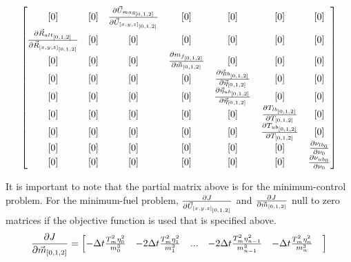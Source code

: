 \begin{equation}
\begin{bmatrix}
[0] &
[0] &
\pdv{\vec{U}_{mag_{[0,1,2]}}}{\vec{U}_{[x,y,z]_{[0,1,2]}}} &
[0] &
[0] &
[0] &
[0]  \\

\pdv{\vec{R}_{alt_{[0,1,2]}}}{\vec{R}_{[x,y,z]_{[0,1,2]}}} &
[0] &
[0] &
[0] &
[0] &
[0] &
[0]  \\

[0] &
[0] &
[0] &
\pdv{m_{f_{[0,1,2]}}}{\vec{m}_{[0,1,2]}} &
[0] &
[0] &
[0]  \\

[0] &
[0] &
[0] &
[0] &
\pdv{\vec{\eta}_{lb_{[0,1,2]}}}{\vec{\eta}_{[0,1,2]}} &
[0] &
[0]  \\

[0] &
[0] &
[0] &
[0] &
\pdv{\vec{\eta}_{ub_{[0,1,2]}}}{\vec{\eta}_{[0,1,2]}} &
[0] &
[0]  \\

[0] &
[0] &
[0] &
[0] &
[0] &
\pdv{T_{lb_{[0,1,2]}}}{T_{[0,1,2]}} &
[0]  \\

[0] &
[0] &
[0] &
[0] &
[0] &
\pdv{T_{ub_{[0,1,2]}}}{T_{[0,1,2]}} &
[0]  \\

[0] &
[0] &
[0] &
[0] &
[0] &
[0] &
\pdv{\nu_{lb_0}}{\nu_0} \\

[0] &
[0] &
[0] &
[0] &
[0] &
[0] &
\pdv{\nu_{ub_0}}{\nu_0} \\

\end{bmatrix}
\end{equation}

It is important to note that the partial matrix above is for the minimum-control problem. For the minimum-fuel problem, $\pdv{J}{\vec{U}_{[x,y,z]_{[0,1,2]}}}$ and $\pdv{J}{\vec{m}_{[0,1,2]}}$ null to zero matrices if the objective function is used that is specified above.
\begin{equation}
\pdv{J}{\vec{m}_{[0,1,2]}} = 
\begin{bmatrix}
-\Delta t \frac{T_m^2 \eta_0^2 }{m_0^3} & 
-2 \Delta t \frac{T_m^2 \eta_1^2 }{m_1^3} & 
... & 
-2 \Delta t \frac{T_m^2 \eta_{n-1}^2 }{m_{n-1}^3} & 
-\Delta t \frac{T_m^2 \eta_{n}^2 }{m_{n}^3} & 
\end{bmatrix}
\end{equation}
